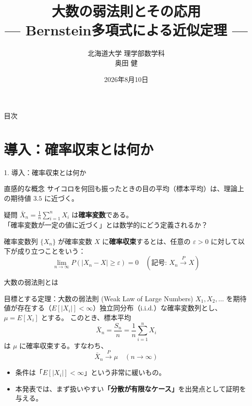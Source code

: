 \documentclass[10pt, aspectratio=169, dvipdfmx]{beamer}
\title[大数の弱法則とBernstein多項式]{大数の弱法則とその応用\\ --- Bernstein多項式による近似定理 ---}
\author[奥田 健]{北海道大学 理学部数学科 \\ 奥田 健}
\date{2026年8月10日}
\begin{document}
\begin{frame}
    \titlepage
\end{frame}

\begin{frame}{目次}
    \tableofcontents
\end{frame}

\section{導入：確率収束とは何か}

\begin{frame}{1. 導入：確率収束とは何か}
    \begin{block}{直感的な概念}
        サイコロを何回も振ったときの目の平均（標本平均）は、理論上の期待値 $3.5$ に近づく。
    \end{block}

    \pause
    \begin{alertblock}{疑問}
        $\bar{X}_n = \frac{1}{n}\sum_{i=1}^n X_i$ は\textbf{確率変数}である。\\
        「確率変数が一定の値に近づく」とは数学的にどう定義されるか？
    \end{alertblock}

    \pause
    \begin{definition}
        確率変数列 $\{X_n\}$ が確率変数 $X$ に\textbf{確率収束}するとは、任意の $\varepsilon > 0$ に対して以下が成り立つことをいう：
        \[
            \lim_{n \to \infty} P(|X_n - X| \ge \varepsilon) = 0 \quad (\text{記号: } X_n \xrightarrow{P} X)
        \]
    \end{definition}
\end{frame}

\begin{frame}{大数の弱法則とは}

    \begin{block}{目標とする定理：大数の弱法則 (Weak Law of Large Numbers)}
        $X_1, X_2, \dots$ を期待値が存在する（$E[|X_i|] < \infty$）独立同分布（i.i.d.）な確率変数列とし、$\mu = E[X_i]$ とする。
        このとき、標本平均
        \[
            \bar{X}_n = \frac{S_n}{n} = \frac{1}{n}\sum_{i=1}^n X_i
        \]
        は $\mu$ に確率収束する。すなわち、
        \[
            \bar{X}_n \xrightarrow{P} \mu \quad (n \to \infty)
        \]
    \end{block}

    \pause
    \begin{itemize}
        \item 条件は「$E[|X_i|] < \infty$」という非常に緩いもの。
        \item 本発表では、まず扱いやすい\textbf{「分散が有限なケース」}を出発点として証明を与える。
    \end{itemize}
\end{frame}
\end{document}
